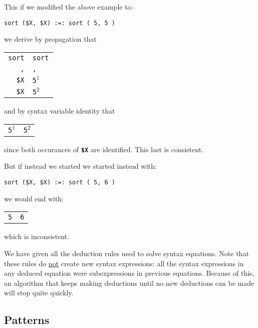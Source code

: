 \documentclass[12pt]{article}
\newcommand{\TT}[1]{{\tt \bfseries #1}}
\begin{document}
This if we modified the above example to:

\begin{center}
\verb/sort ($X, $X) :=: sort ( 5, 5 )/
\end{center}

we derive by propagation that

\begin{center}
\begin{tabular}{r@\TT{~:=:~}l}
\verb/sort/ & \verb/sort/ \\
\verb/,/ & \verb/,/ \\
\verb/$X/ & \verb/5/$^1$ \\
\verb/$X/ & \verb/5/$^2$ \\
\end{tabular}
\end{center}

and by syntax variable identity that

\begin{center}
\begin{tabular}{r@\TT{~:=:~}l}
\verb/5/$^1$ & \verb/5/$^2$ \\
\end{tabular}
\end{center}

since both occurances of \TT{\$X} are identified.
This last is consistent.

But if instead we started we started instead with:

\begin{center}
\verb/sort ($X, $X) :=: sort ( 5, 6 )/
\end{center}

we would end with:

\begin{center}
\begin{tabular}{r@\TT{~:=:~}l}
\verb/5/ & \verb/6/ \\
\end{tabular}
\end{center}

which is inconsistent.

We have given all the deduction rules used to solve syntax equations.
Note that these rules do \underline{not} create new syntax expressions:
all the syntax expressions in any deduced equation were subexpressions
in previous equations.  Because of this,
an algorithm that keeps making deductions until
no new deductions can be made will stop quite quickly.

\subsection{Patterns}
\label{PATTERNS}
\label{PATTERN-EQUATIONS}
\end{document}
